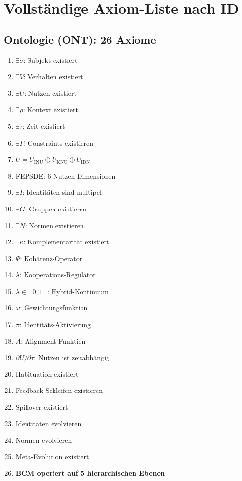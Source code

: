 \documentclass[11pt,a4paper]{article}
\theoremstyle{definition}
\theoremstyle{plain}
\begin{document}

\appendix

\section{Vollständige Axiom-Liste nach ID}

\subsection{Ontologie (ONT): 26 Axiome}
\begin{enumerate}[label=MA-ONT-\arabic*:, leftmargin=3cm]
    \item $\exists \sigma$: Subjekt existiert
    \item $\exists V$: Verhalten existiert
    \item $\exists U$: Nutzen existiert
    \item $\exists \rho$: Kontext existiert
    \item $\exists \tau$: Zeit existiert
    \item $\exists \Gamma$: Constraints existieren
    \item $U = U_{\text{INU}} \oplus U_{\text{KNU}} \oplus U_{\text{IDN}}$
    \item FEPSDE: 6 Nutzen-Dimensionen
    \item $\exists I$: Identitäten sind multipel
    \item $\exists G$: Gruppen existieren
    \item $\exists N$: Normen existieren
    \item $\exists \kappa$: Komplementarität existiert
    \item $\Psi$: Kohärenz-Operator
    \item $\lambda$: Kooperations-Regulator
    \item $\lambda \in [0,1]$: Hybrid-Kontinuum
    \item $\omega$: Gewichtungsfunktion
    \item $\pi$: Identitäts-Aktivierung
    \item $A$: Alignment-Funktion
    \item $\partial U / \partial \tau$: Nutzen ist zeitabhängig
    \item Habituation existiert
    \item Feedback-Schleifen existieren
    \item Spillover existiert
    \item Identitäten evolvieren
    \item Normen evolvieren
    \item Meta-Evolution existiert
    \item \textbf{BCM operiert auf 5 hierarchischen Ebenen}
\end{enumerate}
\end{document}
